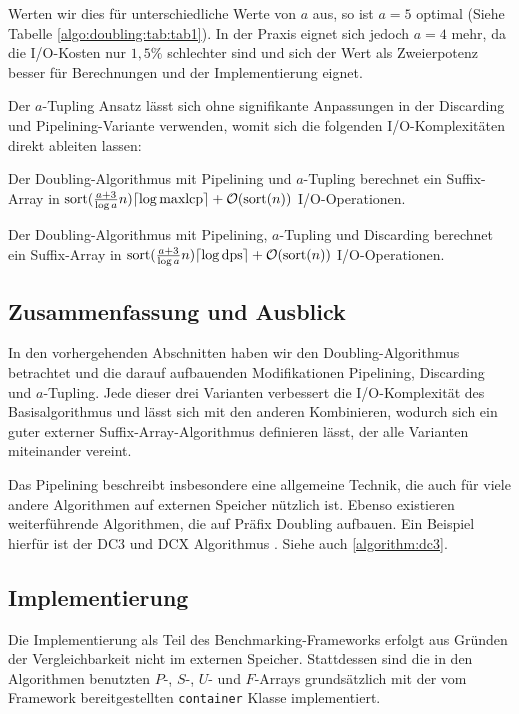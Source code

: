 Werten wir dies für unterschiedliche Werte von $a$ aus, so ist $a = 5$ optimal (Siehe Tabelle \ref{algo:doubling:tab:tab1}). In der Praxis eignet sich jedoch $a = 4$ mehr, da die I/O-Kosten nur $1,5\%$ schlechter sind und sich der Wert als Zweierpotenz besser für Berechnungen und der Implementierung eignet.

Der $a$-Tupling Ansatz lässt sich ohne signifikante Anpassungen in der Discarding und Pipelining-Variante verwenden, womit sich die folgenden I/O-Komplexitäten direkt ableiten lassen:

\begin{theorem}
Der Doubling-Algorithmus mit Pipelining und $a$-Tupling berechnet ein Suffix-Array in $\text{sort}(\frac{a + 3}{\log a}n) \ceil*{\log \text{maxlcp}} +  \mathcal{O}(\text{sort}(n))$ I/O-Operationen.
\end{theorem}

\begin{theorem}
Der Doubling-Algorithmus mit Pipelining, $a$-Tupling und Discarding berechnet ein Suffix-Array in $\text{sort}(\frac{a + 3}{\log a}n) \ceil*{\log \text{dps}} +  \mathcal{O}(\text{sort}(n))$ I/O-Operationen.
\end{theorem}

\subsection{Zusammenfassung und Ausblick}
\label{algo:doubling:sec:summary}

In den vorhergehenden Abschnitten haben wir den Doubling-Algorithmus betrachtet und die darauf aufbauenden Modifikationen Pipelining, Discarding und $a$-Tupling. Jede dieser drei Varianten verbessert die I/O-Komplexität des Basisalgorithmus und lässt sich mit den anderen Kombinieren, wodurch sich ein guter externer Suffix-Array-Algorithmus definieren lässt, der alle Varianten miteinander vereint.

Das Pipelining beschreibt insbesondere eine allgemeine Technik, die auch für viele andere Algorithmen auf externen Speicher nützlich ist. Ebenso existieren weiterführende Algorithmen, die auf Präfix Doubling aufbauen. Ein Beispiel hierfür ist der DC3 und DCX Algorithmus \cite{saca:11}. Siehe auch \cref{algorithm:dc3}.

\subsection{Implementierung}
Die Implementierung als Teil des Benchmarking-Frameworks erfolgt aus Gründen der Vergleichbarkeit nicht im externen Speicher. Stattdessen sind die in den Algorithmen benutzten $P$-, $S$-, $U$- und $F$-Arrays grundsätzlich mit der vom Framework bereitgestellten \texttt{container} Klasse implementiert.

